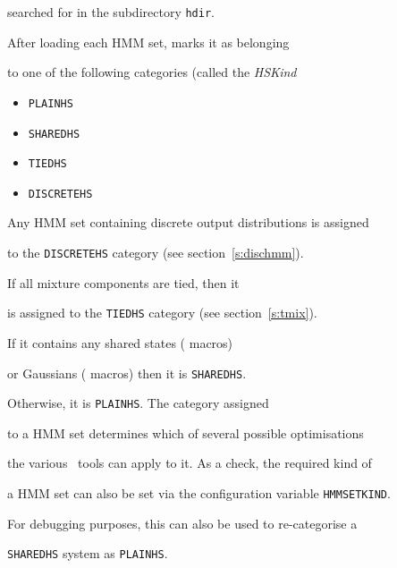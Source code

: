 searched for in the subdirectory \texttt{hdir}.








After loading each HMM set,  marks it as belonging


to one of the following categories (called the \textit{HSKind}


\begin{itemize}


\item \texttt{PLAINHS}


\item \texttt{SHAREDHS}


\item \texttt{TIEDHS}


\item \texttt{DISCRETEHS}


\end{itemize}








Any HMM set containing discrete output distributions is assigned


to the \texttt{DISCRETEHS} category (see section~\ref{s:dischmm}).  


If all mixture components are tied, then it


is assigned to the \texttt{TIEDHS} category (see section~\ref{s:tmix}).  


If it contains any shared states ( macros) 


or Gaussians ( macros) then it is \texttt{SHAREDHS}.


Otherwise, it is \texttt{PLAINHS}. The  category assigned


to a HMM set determines which of several possible optimisations


the various \HTK\ tools can apply to it.  As a check, the required kind of


a HMM set can also be set via the configuration variable \texttt{HMMSETKIND}.


For debugging purposes, this can also be used to re-categorise a 


\texttt{SHAREDHS} system as \texttt{PLAINHS}.





